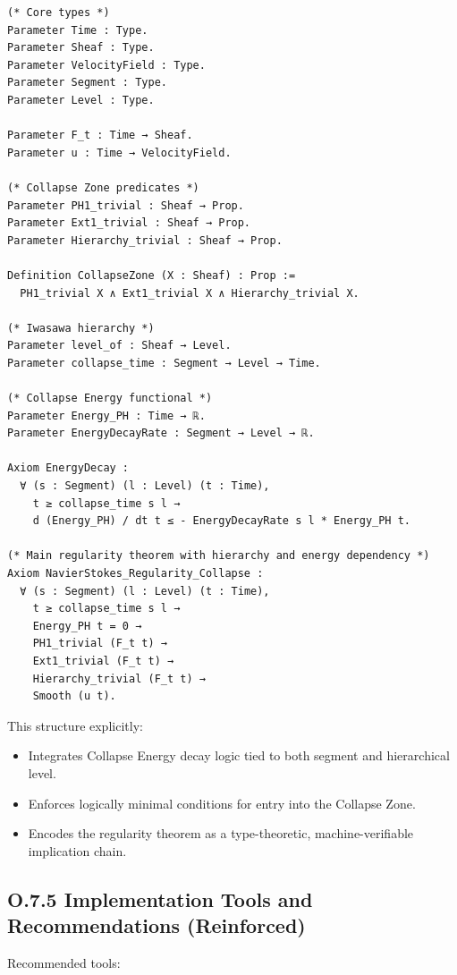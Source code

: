 \documentclass[11pt]{article}
\begin{document}
\begin{lstlisting}[language=Coq]
(* Core types *)
Parameter Time : Type.
Parameter Sheaf : Type.
Parameter VelocityField : Type.
Parameter Segment : Type.
Parameter Level : Type.

Parameter F_t : Time → Sheaf.
Parameter u : Time → VelocityField.

(* Collapse Zone predicates *)
Parameter PH1_trivial : Sheaf → Prop.
Parameter Ext1_trivial : Sheaf → Prop.
Parameter Hierarchy_trivial : Sheaf → Prop.

Definition CollapseZone (X : Sheaf) : Prop :=
  PH1_trivial X ∧ Ext1_trivial X ∧ Hierarchy_trivial X.

(* Iwasawa hierarchy *)
Parameter level_of : Sheaf → Level.
Parameter collapse_time : Segment → Level → Time.

(* Collapse Energy functional *)
Parameter Energy_PH : Time → ℝ.
Parameter EnergyDecayRate : Segment → Level → ℝ.

Axiom EnergyDecay :
  ∀ (s : Segment) (l : Level) (t : Time),
    t ≥ collapse_time s l →
    d (Energy_PH) / dt t ≤ - EnergyDecayRate s l * Energy_PH t.

(* Main regularity theorem with hierarchy and energy dependency *)
Axiom NavierStokes_Regularity_Collapse :
  ∀ (s : Segment) (l : Level) (t : Time),
    t ≥ collapse_time s l →
    Energy_PH t = 0 →
    PH1_trivial (F_t t) →
    Ext1_trivial (F_t t) →
    Hierarchy_trivial (F_t t) →
    Smooth (u t).
\end{lstlisting}

This structure explicitly:

\begin{itemize}
  \item Integrates Collapse Energy decay logic tied to both segment and hierarchical level.
  \item Enforces logically minimal conditions for entry into the Collapse Zone.
  \item Encodes the regularity theorem as a type-theoretic, machine-verifiable implication chain.
\end{itemize}

\subsection*{O.7.5 Implementation Tools and Recommendations (Reinforced)}

Recommended tools:
\end{document}
